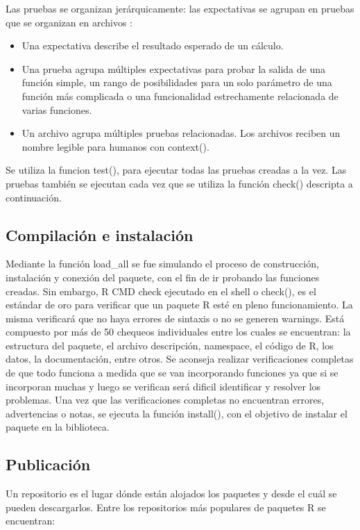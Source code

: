 Las pruebas se organizan jerárquicamente: las expectativas se agrupan en pruebas que se organizan en archivos :
\begin{itemize}
\item Una expectativa describe el resultado esperado de un cálculo.

\item Una prueba agrupa múltiples expectativas para probar la salida de una función simple, un rango de posibilidades para un solo parámetro de una función más complicada o una funcionalidad estrechamente relacionada de varias funciones.

\item Un archivo agrupa múltiples pruebas relacionadas. Los archivos reciben un nombre legible para humanos con context().
\end{itemize}

Se utiliza la funcion test(), para ejecutar todas las pruebas creadas a la vez. Las pruebas también se ejecutan cada vez que se utiliza la función check() descripta a continuación. 

\subsection{Compilación e instalación}

Mediante la función load\_all se fue simulando el proceso de construcción, instalación y conexión del paquete, con el fin de ir probando las funciones creadas. Sin embargo, R CMD check ejecutado en el shell o check(), es el estándar de oro para verificar que un paquete R esté en pleno funcionamiento. La misma verificará que no haya errores de sintaxis o no se generen warnings. Está compuesto por más de 50 chequeos individuales entre los cuales se encuentran: la estructura del paquete, el archivo descripción, namespace, el código de R, los datos, la documentación, entre otros. Se aconseja realizar verificaciones completas de que todo funciona a medida que se van incorporando funciones ya que si se incorporan muchas y luego se verifican será dificil identificar y resolver los problemas. Una vez que las verificaciones completas no encuentran errores, advertencias o notas, se ejecuta la función install(), con el objetivo de instalar el paquete en la biblioteca.


\subsection{Publicación}
Un repositorio es el lugar dónde están alojados los paquetes y desde el cuál se pueden descargarlos. Entre los repositorios más populares de paquetes R se encuentran:


